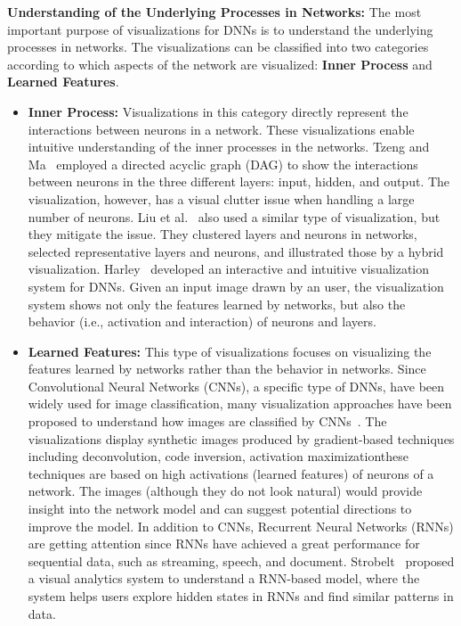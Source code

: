 \textbf{Understanding of the Underlying Processes in Networks:}
The most important purpose of visualizations for DNNs is to understand the underlying processes in networks.
The visualizations can be classified into two categories according to which aspects of the network are visualized: \textbf{Inner Process} and \textbf{Learned Features}.
\begin{itemize}
\item \textbf{Inner Process:}
Visualizations in this category directly represent the interactions between neurons in a network.
These visualizations enable intuitive understanding of the inner processes in the networks.
Tzeng and Ma~\cite{tzeng2005opening} employed a directed acyclic graph (DAG) to show the interactions between neurons in the three different layers: input, hidden, and output.
The visualization, however, has a visual clutter issue when handling a large number of neurons.
Liu et al.~\cite{liu2017towards} also used a similar type of visualization, but they mitigate the issue.
They clustered layers and neurons in networks, selected representative layers and neurons, and illustrated those by a hybrid visualization.
Harley~\cite{harley2015interactive} developed an interactive and intuitive visualization system for DNNs.
Given an input image drawn by an user, the visualization system shows not only the features learned by networks, but also the behavior (i.e., activation and interaction) of neurons and layers.

\item \textbf{Learned Features:}
This type of visualizations focuses on visualizing the features learned by networks rather than the behavior in networks.
Since Convolutional Neural Networks (CNNs), a specific type of DNNs, have been widely used for image classification, many visualization approaches have been proposed to understand how images are classified by CNNs~\cite{erhan2009visualizing,zeiler2014visualizing,yosinski2015understanding,nguyen2016multifaceted}.
The visualizations display synthetic images produced by gradient-based techniques including deconvolution, code inversion, activation maximization\textemdash these techniques are based on high activations (learned features) of neurons of a network.
The images (although they do not look natural) would provide insight into the network model and can suggest potential directions to improve the model.
In addition to CNNs, Recurrent Neural Networks (RNNs) are getting attention since RNNs have achieved a great performance for sequential data, such as streaming, speech, and document.
Strobelt~\cite{strobelt2016visual} proposed a visual analytics system to understand a RNN-based model, where the system helps users explore hidden states in RNNs and find similar patterns in data.
\end{itemize}

